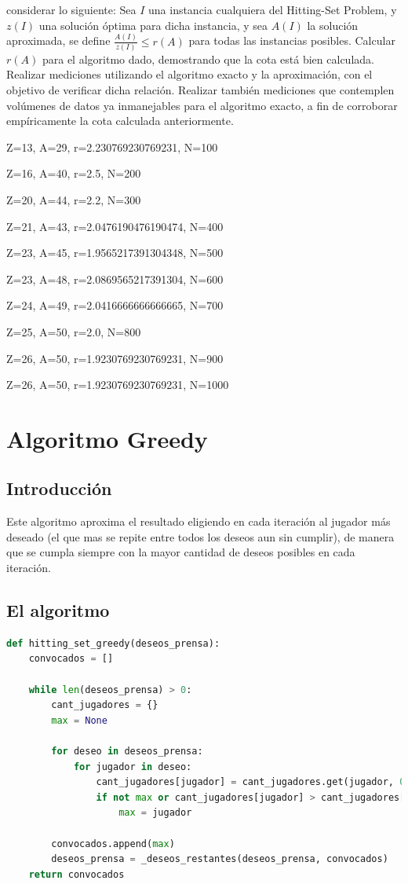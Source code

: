 \documentclass{estilo}
\begin{document}
considerar lo siguiente:
    Sea $I$ una instancia cualquiera del Hitting-Set Problem, y $z(I)$ una
    solución óptima para dicha instancia, y sea $A(I)$ la solución aproximada,
    se define $\frac{A(I)}{z(I)} \leq r(A)$ para todas las instancias posibles.
    Calcular $r(A)$ para el algoritmo dado, demostrando que la cota está bien
    calculada. Realizar mediciones utilizando el algoritmo exacto y la aproximación,
    con el objetivo de verificar dicha relación. Realizar también mediciones
    que contemplen volúmenes de datos ya inmanejables para el algoritmo exacto,
    a fin de corroborar empíricamente la cota calculada anteriormente.


Z=13, A=29, r=2.230769230769231, N=100

Z=16, A=40, r=2.5, N=200

Z=20, A=44, r=2.2, N=300

Z=21, A=43, r=2.0476190476190474, N=400

Z=23, A=45, r=1.9565217391304348, N=500

Z=23, A=48, r=2.0869565217391304, N=600

Z=24, A=49, r=2.0416666666666665, N=700

Z=25, A=50, r=2.0, N=800

Z=26, A=50, r=1.9230769230769231, N=900

Z=26, A=50, r=1.9230769230769231, N=1000


\newpage

\section{Algoritmo Greedy}

\subsection{Introducción}

Este algoritmo aproxima el resultado eligiendo en cada iteración al jugador más deseado (el que mas se repite entre todos los deseos aun sin cumplir), de manera que se cumpla siempre con la mayor cantidad de deseos posibles en cada iteración.

\subsection{El algoritmo}

\begin{lstlisting}[language=Python]
def hitting_set_greedy(deseos_prensa):
    convocados = []

    while len(deseos_prensa) > 0:
        cant_jugadores = {}
        max = None
        
        for deseo in deseos_prensa:
            for jugador in deseo:
                cant_jugadores[jugador] = cant_jugadores.get(jugador, 0) + 1
                if not max or cant_jugadores[jugador] > cant_jugadores[max]:
                    max = jugador
                    
        convocados.append(max)
        deseos_prensa = _deseos_restantes(deseos_prensa, convocados)
    return convocados
\end{lstlisting}
\end{document}
